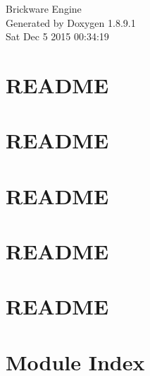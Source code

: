 \documentclass[twoside]{book}
\newcommand{\+}{\discretionary{\mbox{\scriptsize$\hookleftarrow$}}{}{}}
\newcommand{\clearemptydoublepage}{%
  \newpage{\pagestyle{empty}\cleardoublepage}%
}
\begin{document}
\hypersetup{pageanchor=false,
             bookmarks=true,
             bookmarksnumbered=true,
             pdfencoding=unicode
            }
\begin{titlepage}
\vspace*{7cm}
\begin{center}%
{\Large Brickware Engine }\\
\vspace*{1cm}
{\large Generated by Doxygen 1.8.9.1}\\
\vspace*{0.5cm}
{\small Sat Dec 5 2015 00:34:19}\\
\end{center}
\end{titlepage}
\clearemptydoublepage
\tableofcontents
\clearemptydoublepage
{}
\hypersetup{pageanchor=true}

\chapter{R\+E\+A\+D\+M\+E}
\label{md_BrickwareCore_README}
\hypertarget{md_BrickwareCore_README}{}

\chapter{R\+E\+A\+D\+M\+E}
\label{md_BrickwareGraphics_README}
\hypertarget{md_BrickwareGraphics_README}{}

\chapter{R\+E\+A\+D\+M\+E}
\label{md_BrickwareMath_README}
\hypertarget{md_BrickwareMath_README}{}

\chapter{R\+E\+A\+D\+M\+E}
\label{md_BrickwareUtils_README}
\hypertarget{md_BrickwareUtils_README}{}

\chapter{R\+E\+A\+D\+M\+E}
\label{md_README}
\hypertarget{md_README}{}

\chapter{Module Index}

\end{document}

